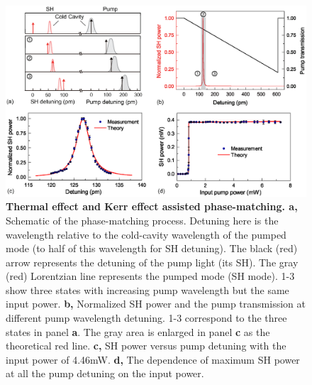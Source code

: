 \documentclass[a4paper,8pt,hyperref, twocolumn]{article}
\begin{document}
\begin{figure}[!ht]
\centering
\includegraphics[width=17cm]{try_ed3.eps}
\caption{\textbf{Thermal effect and Kerr effect assisted phase-matching. a, }Schematic of the phase-matching process. Detuning here is the wavelength relative to the cold-cavity wavelength of the pumped mode (to half of this wavelength for SH detuning). The black (red) arrow represents the detuning of the pump light (its SH). The gray (red) Lorentzian line represents the pumped mode (SH mode). 1-3 show three states with increasing pump wavelength but the same input power. \textbf{b, }Normalized SH power and the pump transmission at different pump wavelength detuning. 1-3 correspond to the three states in panel \textbf{a}. The gray area is enlarged in panel \textbf{c} as the theoretical red line. \textbf{c, }SH power versus pump detuning with the input power of 4.46mW. \textbf{d, }The dependence of maximum SH power at all the pump detuning on the input power.}
\label{pic:Fig2}
\end{figure}



\end{document}
